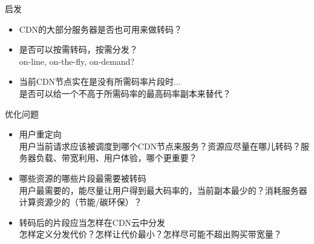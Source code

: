 \documentclass{beamer}
\begin{document}
\begin{frame}{启发}
\begin{itemize}
\item CDN的大部分服务器是否也可用来做转码？\\
\item 是否可以按需转码，按需分发？\\
on-line, on-the-fly, on-demand?
\item 当前CDN节点实在是没有所需码率片段时...\\
是否可以给一个不高于所需码率的最高码率副本来替代？
\end{itemize}
\end{frame}

\begin{frame}{优化问题}
\begin{itemize}
\item 用户重定向\\
用户当前请求应该被调度到哪个CDN节点来服务？资源应尽量在哪儿转码？服务器负载、带宽利用、用户体验，哪个更重要？
\item 哪些资源的哪些片段最需要被转码\\
用户最需要的，能尽量让用户得到最大码率的，当前副本最少的？消耗服务器计算资源少的（节能/碳环保）？
\item 转码后的片段应当怎样在CDN云中分发\\
怎样定义分发代价？怎样让代价最小？怎样尽可能不超出购买带宽量？
\end{itemize}
\end{frame}
\end{document}
